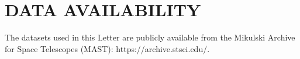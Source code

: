 \documentclass[fleqn,usenatbib]{mnras}
\begin{document}
 \section*{DATA AVAILABILITY}
The datasets used in this Letter are publicly available from the Mikulski Archive for Space Telescopes (MAST): https://archive.stsci.edu/.






\clearpage




\appendix
\end{document}
